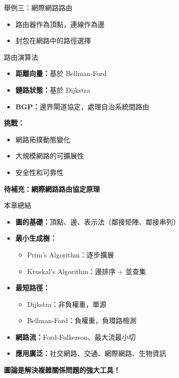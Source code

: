 \documentclass{beamer}
\begin{document}
\begin{frame}{舉例三：網際網路路由}
\begin{itemize}
    \item 路由器作為頂點，連線作為邊
    \item 封包在網路中的路徑選擇
\end{itemize}

\vspace{1em}
\begin{block}{路由演算法}
\begin{itemize}
    \item \textbf{距離向量：}基於 Bellman-Ford
    \item \textbf{鏈路狀態：}基於 Dijkstra
    \item \textbf{BGP：}邊界閘道協定，處理自治系統間路由
\end{itemize}
\end{block}

\vspace{1em}
\textbf{挑戰：}
\begin{itemize}
    \item 網路拓撲動態變化
    \item 大規模網路的可擴展性
    \item 安全性和可靠性
\end{itemize}

\vspace{1em}
\textbf{待補充：網際網路路由協定原理}
\end{frame}

\begin{frame}{本章總結}
\begin{itemize}
    \item \textbf{圖的基礎：}頂點、邊、表示法（鄰接矩陣、鄰接串列）
    \item \textbf{最小生成樹：}
    \begin{itemize}
        \item Prim's Algorithm：逐步擴展
        \item Kruskal's Algorithm：邊排序 + 並查集
    \end{itemize}
    \item \textbf{最短路徑：}
    \begin{itemize}
        \item Dijkstra：非負權重，單源
        \item Bellman-Ford：負權重，負環路檢測
    \end{itemize}
    \item \textbf{網路流：}Ford-Fulkerson、最大流最小切
    \item \textbf{應用廣泛：}社交網路、交通、網際網路、生物資訊
\end{itemize}

\vspace{1em}
\begin{center}
    \textbf{圖論是解決複雜關係問題的強大工具！}
\end{center}
\end{frame}
\end{document}
